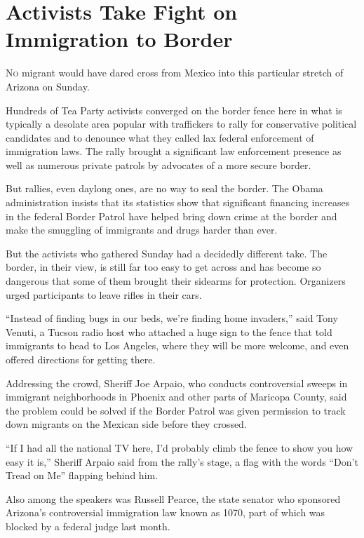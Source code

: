 ﻿\documentclass[12pt]{article}
\begin{document}
\section{Activists Take Fight on Immigration to Border}

\lettrine{N}{o} migrant would have dared cross from Mexico into this
particular stretch of Arizona on Sunday.

Hundreds of Tea Party activists converged on the border fence here in what is typically a desolate
area popular with traffickers to rally for conservative political candidates and to denounce what
they called lax federal enforcement of immigration laws. The rally brought a significant law
enforcement presence as well as numerous private patrols by advocates of a more secure border.

But rallies, even daylong ones, are no way to seal the border. The Obama administration insists that
its statistics show that significant financing increases in the federal Border Patrol have helped
bring down crime at the border and make the smuggling of immigrants and drugs harder than ever.

But the activists who gathered Sunday had a decidedly different take. The border, in their view, is
still far too easy to get across and has become so dangerous that some of them brought their
sidearms for protection. Organizers urged participants to leave rifles in their cars.

``Instead of finding bugs in our beds, we're finding home invaders,'' said Tony Venuti, a Tucson
radio host who attached a huge sign to the fence that told immigrants to head to Los Angeles, where
they will be more welcome, and even offered directions for getting there.

Addressing the crowd, Sheriff Joe Arpaio, who conducts controversial sweeps in immigrant
neighborhoods in Phoenix and other parts of Maricopa County, said the problem could be solved if the
Border Patrol was given permission to track down migrants on the Mexican side before they crossed.

``If I had all the national TV here, I'd probably climb the fence to show you how easy it is,''
Sheriff Arpaio said from the rally's stage, a flag with the words ``Don't Tread on Me'' flapping
behind him.

Also among the speakers was Russell Pearce, the state senator who sponsored Arizona's controversial
immigration law known as 1070, part of which was blocked by a federal judge last month.
\end{document}
